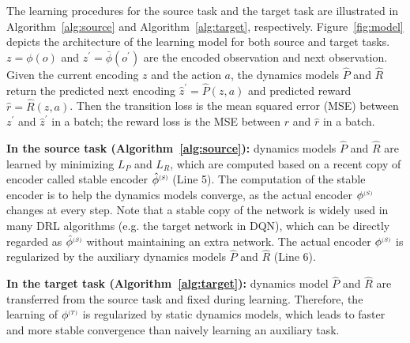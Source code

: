 The learning procedures for the source task and the target task are illustrated in Algorithm~\ref{alg:source} and Algorithm~\ref{alg:target}, respectively. Figure~\ref{fig:model} depicts the architecture of the learning model for both source and target tasks. 
$z=\phi(o)$ and $z^\prime=\bar{\phi}(o^\prime)$ are the encoded observation and next observation.
Given the current encoding $z$ and the action $a$, the dynamics models $\hat{P}$ and $\hat{R}$ return the predicted next encoding $\hat{z}^\prime=\hat{P}(z, a)$ and predicted reward $\hat{r}=\hat{R}(z, a)$.
Then the transition loss is the mean squared error (MSE) between $z^\prime$ and $\hat{z}^\prime$ in a batch; the reward loss is the MSE between $r$ and $\hat{r}$ in a batch.


\textbf{In the source task (Algorithm~\ref{alg:source}):} 
dynamics models $\hat{P}$ and $\hat{R}$ are learned by minimizing $L_P$ and $L_R$, which are computed based on a recent copy of encoder called stable encoder $\hat{\phi}\source$ (Line 5).
The computation of the stable encoder is to help the dynamics models converge, as the actual encoder $\phi\source$ changes at every step. Note that a stable copy of the network is widely used in many DRL algorithms (e.g. the target network in DQN), which can be directly regarded as $\hat{\phi}\source$ without maintaining an extra network. 
The actual encoder $\phi\source$ is regularized by the auxiliary dynamics models $\hat{P}$ and $\hat{R}$ (Line 6).

\textbf{In the target task (Algorithm~\ref{alg:target}):} 
dynamics model $\hat{P}$ and $\hat{R}$ are transferred from the source task and fixed during learning. Therefore, the learning of $\phi\target$ is regularized by static dynamics models, which leads to faster and more stable convergence than naively learning an auxiliary task.


